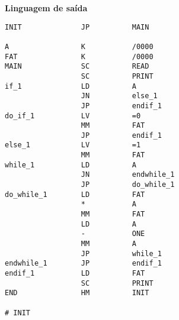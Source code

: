 \textbf{Linguagem de saída} \\

\begin{lstlisting}
INIT              JP          MAIN

A                 K           /0000       
FAT               K           /0000       
MAIN              SC          READ       
                  SC          PRINT         
if_1              LD          A 
                  JN          else_1
                  JP          endif_1
do_if_1           LV          =0          
                  MM          FAT
                  JP          endif_1
else_1            LV          =1          
                  MM          FAT
while_1           LD          A
                  JN          endwhile_1
                  JP          do_while_1
do_while_1        LD          FAT
                  *           A
                  MM          FAT
                  LD          A
                  -           ONE
                  MM          A
                  JP          while_1
endwhile_1        JP          endif_1
endif_1           LD          FAT
                  SC          PRINT   
END               HM          INIT

# INIT        
\end{lstlisting}